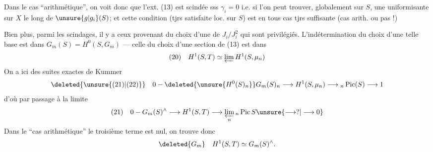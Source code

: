 Dans le cas ``arithmétique'', on voit donc que l'ext. (13) est scindée sss $\gamma_i=0$ i.e. si l'on peut trouver, globalement sur $S$, une uniformisante sur $X$ le long de $\unsure{g|g_i}(S)$; et cette condition (tjrs satisfaite loc. sur $S$) est en tous cas tjrs suffisante (cas arith. ou pas !)

Bien plus, parmi les scindages, il y a ceux provenant du choix d'une  de $J_i/J_i^2$ qui sont privilégiés. L'indétermination du choix d'une telle base est dans $G_m(S)=H^0(S,G_m)$ --- celle du choix d'une section de (13) est dans
\[
(20)\quad H^1(S,T)\simeq\varprojlim H^1(S,\mu_n)
\]
On a ici des suites exactes de Kummer
\[
\deleted{\unsure{(21)|(22)}}\quad 0-\deleted{\unsure{H^0(S)_n}}G_m(S)_n\longrightarrow H^1(S,\mu_n)\longrightarrow{}_n\operatorname{Pic}(S)\longrightarrow1
\]
d'où par passage à la limite
\[
(21)\quad 0-G_m(S)^\wedge\longrightarrow H^1(S,T)\longrightarrow\varprojlim_n{}_n\operatorname{Pic}S\unsure{\longrightarrow?|\longrightarrow0}
\]
Dans le ``cas arithmétique'' le troisième terme est nul, on trouve donc
\[
\deleted{G_m}\quad H^1(S,T)\simeq G_m(S)^\wedge.
\]
